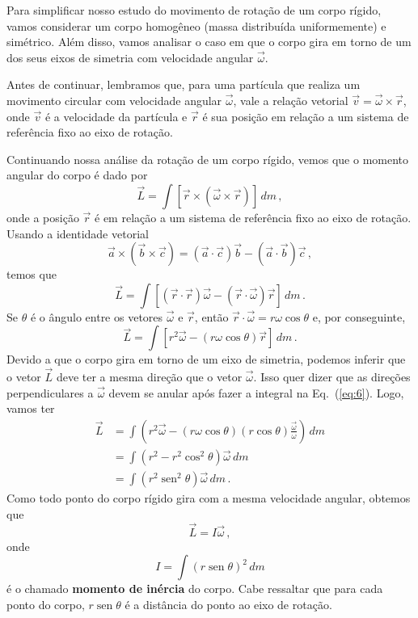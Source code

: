\documentclass[twocolumn=on,fontsize=12pt,DIV=calc]{scrartcl}
\newcommand{\dpar}[1]{\left(#1\right)}
\theoremstyle{definition}
\DeclareMathOperator{\sen}{sen}
\begin{document}
Para simplificar nosso estudo do movimento de rotação de um corpo
rígido, vamos considerar um corpo homogêneo (massa distribuída
uniformemente) e simétrico. Além disso, vamos analisar o caso em que o
corpo gira em torno de um dos seus eixos de simetria com velocidade
angular $\vec\omega$.

Antes de continuar, lembramos que, para uma partícula que realiza um
movimento circular com velocidade angular $\vec\omega$, vale a relação
vetorial $\vec v=\vec\omega\times\vec r$, onde $\vec v$ é a velocidade
da partícula e $\vec r$ é sua posição em relação a um sistema de
referência fixo ao eixo de rotação.

Continuando nossa análise da rotação de um corpo rígido, vemos que o
momento angular do corpo é dado por
$$\vec L=\int [\vec r\times(\vec\omega\times\vec r)]\,dm\,,$$
onde a posição $\vec r$ é em relação a um sistema de referência fixo
ao eixo de rotação.  Usando a identidade vetorial
$$\vec a\times(\vec b\times\vec c)=(\vec a\cdot\vec c)\vec b-(\vec a\cdot\vec b)\vec c\,,$$
temos que
\begin{equation}
  \label{eq:6}
  \vec L=\int [(\vec r\cdot\vec r)\vec\omega-(\vec r\cdot\vec\omega)\vec r]\,dm\,.
\end{equation}
Se $\theta$ é o ângulo entre os vetores $\vec\omega$ e $\vec r$, então
$\vec r\cdot\vec \omega=r\omega\cos\theta$ e, por conseguinte,
$$\vec L=\int [r^2\vec\omega-(r\omega\cos\theta)\vec r]\,dm\,.$$
Devido a que o corpo gira em torno de um eixo de simetria, podemos
inferir que o vetor $\vec L$ deve ter a mesma direção que o vetor
$\vec\omega$. Isso quer dizer que as direções perpendiculares a
$\vec\omega$ devem se anular após fazer a integral na
Eq.~(\ref{eq:6}). Logo, vamos ter
\begin{equation*}
  \begin{split}
    \vec L&=\int \dpar{r^2\vec\omega-(r\omega\cos\theta)(r\cos\theta)\frac{\vec\omega}{\omega}}\,dm\\
    &=\int (r^2-r^2\cos^2\theta)\vec\omega\,dm\\
    &=\int (r^2\sen^2\theta)\vec\omega\,dm\,.
  \end{split}
\end{equation*}
Como todo ponto do corpo rígido gira com a mesma velocidade angular,
obtemos que
\begin{equation}
  \label{eq:7}
  \vec L=I\vec\omega\,,
\end{equation}
onde
\begin{equation}
  \label{eq:8}
  I=\int (r\sen\theta)^2\,dm
\end{equation}
é o chamado \textbf{momento de inércia} do corpo. Cabe ressaltar que
para cada ponto do corpo, $r\sen\theta$ é a distância do ponto ao eixo
de rotação.
\end{document}
